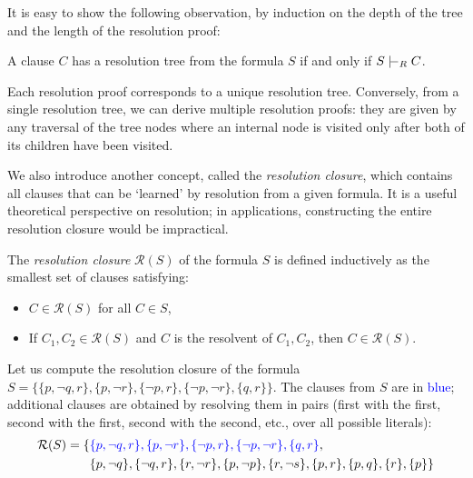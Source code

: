 It is easy to show the following observation, by induction on the depth of the tree and the length of the resolution proof:

\begin{observation} A clause $C$ has a resolution tree from the formula $S$ if and only if $S \proves_R C$.  
\end{observation}

Each resolution proof corresponds to a unique resolution tree. Conversely, from a single resolution tree, we can derive multiple resolution proofs: they are given by any traversal of the tree nodes where an internal node is visited only after both of its children have been visited.

We also introduce another concept, called the \emph{resolution closure}, which contains all clauses that can be `learned' by resolution from a given formula. It is a useful theoretical perspective on resolution; in applications, constructing the entire resolution closure would be impractical.

\begin{definition}
The \emph{resolution closure} $\mathcal{R}(S)$ of the formula $S$ is defined inductively as the smallest set of clauses satisfying:
\begin{itemize}
    \item $C \in \mathcal{R}(S)$ for all $C \in S$,
    \item If $C_1, C_2 \in \mathcal{R}(S)$ and $C$ is the resolvent of $C_1, C_2$, then $C \in \mathcal{R}(S)$.
\end{itemize}
\end{definition}

\begin{example}
    Let us compute the resolution closure of the formula $S = \{\{p, \neg q, r\}, \{p, \neg r\}, \{\neg p, r\}, \{\neg p, \neg r\}, \{q, r\}\}$. The clauses from $S$ are in \textcolor{blue}{blue}; additional clauses are obtained by resolving them in pairs (first with the first, second with the first, second with the second, etc., over all possible literals):
    \begin{align*}
        \mathcal{R}(S) = \{&\textcolor{blue}{\{p, \neg q, r\}, \{p, \neg r\}, \{\neg p, r\}, \{\neg p, \neg r\}, \{q, r\}},\\ &\{p, \neg q\}, \{\neg q, r\}, \{r, \neg r\}, \{p, \neg p\}, \{r, \neg s\}, \{p, r\}, \{p, q\}, \{r\}, \{p\}\}
    \end{align*}
\end{example}

